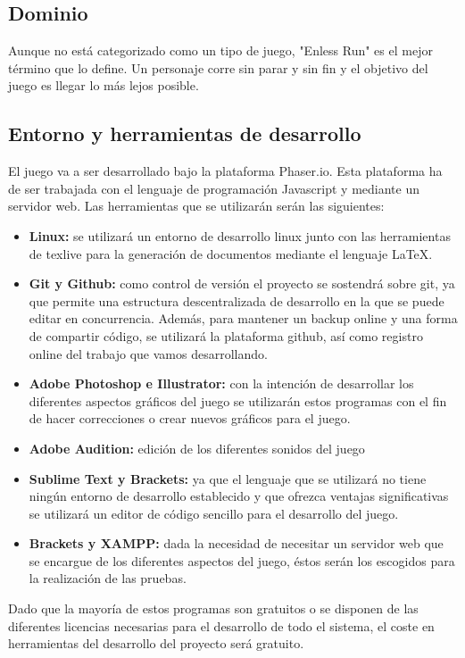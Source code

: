 \documentclass[a4paper]{article}
\begin{document}
\subsection{Dominio}
Aunque no está categorizado como un tipo de juego, "Enless Run" es el mejor término que lo define. Un personaje corre sin parar y sin fin y el objetivo del juego es llegar lo más lejos posible.

\subsection {Entorno y herramientas de desarrollo}
El juego va a ser desarrollado bajo la plataforma Phaser.io. Esta plataforma ha de ser trabajada con el lenguaje de programación Javascript y mediante un servidor web. Las herramientas que se utilizarán serán las siguientes:

\begin{itemize}
	\item \textbf{Linux:} se utilizará un entorno de desarrollo linux junto con las herramientas de texlive para la generación de documentos mediante el lenguaje \LaTeX.
	\item \textbf{Git y Github:} como control de versión el proyecto se sostendrá sobre git, ya que permite una estructura descentralizada de desarrollo en la que se puede editar en concurrencia. Además, para mantener un backup online y una forma de compartir código, se utilizará la plataforma github, así como registro online del trabajo que vamos desarrollando.
	\item \textbf{Adobe Photoshop e Illustrator:} con la intención de desarrollar los diferentes aspectos gráficos del juego se utilizarán estos programas con el fin de hacer correcciones o crear nuevos gráficos para el juego.
	\item \textbf{Adobe Audition:} edición de los diferentes sonidos del juego
	\item \textbf{Sublime Text y Brackets:} ya que el lenguaje que se utilizará no tiene ningún entorno de desarrollo establecido y que ofrezca ventajas significativas se utilizará un editor de código sencillo para el desarrollo del juego.
	\item \textbf{Brackets y XAMPP:} dada la necesidad de necesitar un servidor web que se encargue de los diferentes aspectos del juego, éstos serán los escogidos para la realización de las pruebas.
\end{itemize}

Dado que la mayoría de estos programas son gratuitos o se disponen de las diferentes licencias necesarias para el desarrollo de todo el sistema, el coste en herramientas del desarrollo del proyecto será gratuito.
\end{document}
